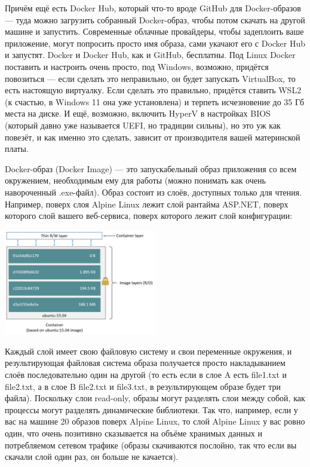 \documentclass{../../text-style}
\begin{document}
Причём ещё есть Docker Hub, который что-то вроде GitHub для Docker-образов --- туда можно загрузить собранный Docker-образ, чтобы потом скачать на другой машине и запустить. Современные облачные провайдеры, чтобы задеплоить ваше приложение, могут попросить просто имя образа, сами укачают его с Docker Hub и запустят. Docker и Docker Hub, как и GitHub, бесплатны. Под Linux Docker поставить и настроить очень просто, под Windows, возможно, придётся повозиться --- если сделать это неправильно, он будет запускать VirtualBox, то есть настоящую виртуалку. Если сделать это правильно, придётся ставить WSL2 (к счастью, в Windows 11 она уже установлена) и терпеть исчезновение до 35 Гб места на диске. И ещё, возможно, включить HyperV в настройках BIOS (который давно уже называется UEFI, но традиции сильны), но это уж как повезёт, и как именно это сделать, зависит от производителя вашей материнской платы.

Docker-образ (Docker Image) --- это запускабельный образ приложения со всем окружением, необходимым ему для работы (можно понимать как очень навороченный .exe-файл). Образ состоит из слоёв, доступных только для чтения. Например, поверх слоя Alpine Linux лежит слой рантайма ASP.NET, поверх которого слой вашего веб-сервиса, поверх которого лежит слой конфигурации:

\begin{center}
    \includegraphics[width=0.5\textwidth]{dockerLayers.png}
\end{center}

Каждый слой имеет свою файловую систему и свои переменные окружения, и результирующая файловая система образа получается просто накладыванием слоёв последовательно один на другой (то есть если в слое A есть file1.txt и file2.txt, а в слое B file2.txt и file3.txt, в результирующем образе будет три файла). Поскольку слои read-only, образы могут разделять слои между собой, как процессы могут разделять динамические библиотеки. Так что, например, если у вас на машине 20 образов поверх Alpine Linux, то слой Alpine Linux у вас ровно один, что очень позитивно сказывается на объёме хранимых данных и потребляемом сетевом трафике (образы скачиваются послойно, так что если вы скачали слой один раз, он больше не качается).
\end{document}

